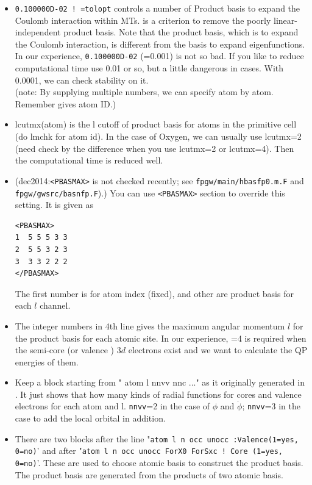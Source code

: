 {\begin{itemize}
\item
\verb+0.100000D-02 ! =tolopt+ controls a number of Product basis
to expand the Coulomb interaction within MTs. 
 is a criterion to remove the poorly linear-independent product basis.
Note that the product basis, which is to expand the
Coulomb interaction, is different from the basis to expand eigenfunctions.
In our experience, \verb+0.100000D-02+ (=0.001) is not so bad.
If you like to reduce computational time use 0.01 or so, but a little
dangerous in cases. With 0.0001, we can check stability on it.\\
(note: By supplying multiple numbers, we can specify  atom by atom.
 Remember  gives atom ID.)

\item
     lcutmx(atom) is the l cutoff of product basis for atoms 
     in the primitive cell (do lmchk for atom id).
     In the case of Oxygen, we can usually use lcutmx=2 (need check by
     the difference when you use lcutmx=2 or lcutmx=4). 
     Then the computational time is reduced well.

\item
(dec2014:\verb#<PBASMAX># is not checked recently;
see \verb#fpgw/main/hbasfp0.m.F# and \verb#fpgw/gwsrc/basnfp.F#).)
You can use \verb#<PBASMAX># section to override this setting. It is given as
\begin{verbatim}
<PBASMAX>
1  5 5 5 3 3
2  5 5 3 2 3
3  3 3 2 2 2
</PBASMAX>
\end{verbatim}
The first number is for atom index (fixed), and other are product basis 
for each $l$ channel.


\item
The integer numbers in 4th line 
gives the maximum angular momentum $l$ for the product basis
for each atomic site.
In our experience, =4 is required
when the semi-core (or valence ) $3d$ electrons exist
and we want to calculate the QP energies of them.

\item
Keep a block starting from 
"  atom   l  nnvv  nnc ..."  as it originally generated 
in . It just shows that how many kinds of radial functions
for cores and valence electrons for each atom and l.
{\tt nnvv}=2 in the case of $\phi$ and $\dot{\phi}$;
{\tt nnvv}=3 in the case to add the local orbital in addition.

\item
There are two blocks after the line
"{\tt   atom   l    n  occ  unocc  :Valence(1=yes, 0=no)}'
and after
"{\tt   atom   l    n  occ unocc  ForX0 ForSxc ! Core (1=yes, 0=no)}'.
These are used to choose atomic basis to construct the product basis.
The product basis are generated from the products of two atomic basis.


\end{itemize}}
